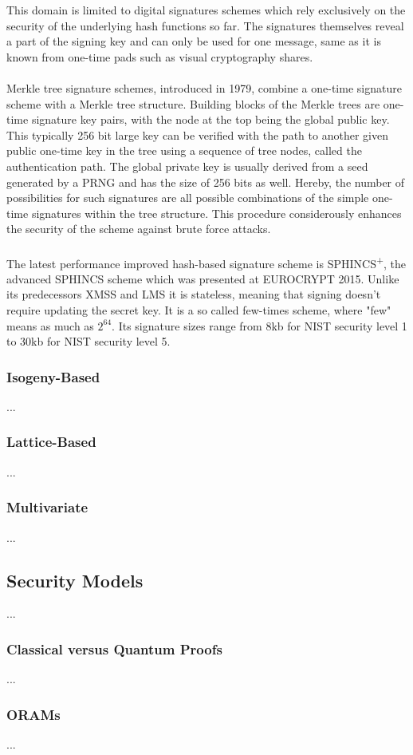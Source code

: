 \documentclass[a4paper,11pt]{article}
\begin{document}
\begin{multicols}{2}
This domain is limited to digital signatures schemes which rely exclusively on the security of the underlying hash functions so far. The signatures themselves reveal a part of the signing key and can only be used for one message, same as it is known from one-time pads such as visual cryptography shares. \\
\\
Merkle tree signature schemes, introduced in 1979, combine a one-time signature scheme with a Merkle tree structure. Building blocks of the Merkle trees are one-time signature key pairs, with the node at the top being the global public key. This typically 256 bit large key can be verified with the path to another given public one-time key in the tree using a sequence of tree nodes, called the authentication path. The global private key is usually derived from a seed generated by a PRNG and has the size of 256 bits as well.
Hereby, the number of possibilities for such signatures are all possible combinations of the simple one-time signatures within the tree structure. This procedure considerously enhances the security of the scheme against brute force attacks. \\
\\
The latest performance improved hash-based signature scheme is SPHINCS\textsuperscript{+}, the advanced SPHINCS scheme which was presented at EUROCRYPT 2015. Unlike its predecessors XMSS and LMS it is stateless, meaning that signing doesn't require updating the secret key. It is a so called few-times scheme, where "few" means as much as $2^{64}$. Its signature sizes range from 8kb for NIST security level 1 to 30kb for NIST security level 5.\\


\subsubsection{Isogeny-Based}
...

\subsubsection{Lattice-Based}
...

\subsubsection{Multivariate}
...


\subsection{Security Models}
...

\subsubsection{Classical versus Quantum Proofs}
...

\subsubsection{ORAMs}
...



\end{multicols}

 
\end{document}
